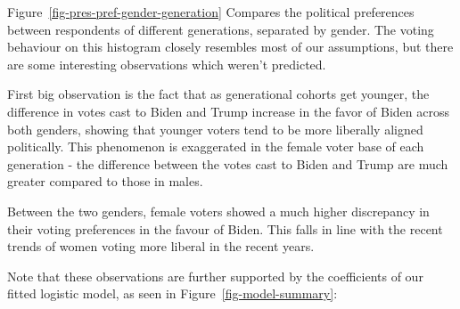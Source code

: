 \documentclass[
  letterpaper,
  DIV=11,
  numbers=noendperiod]{scrartcl}
\begin{document}
Figure~\ref{fig-pres-pref-gender-generation} Compares the political
preferences between respondents of different generations, separated by
gender. The voting behaviour on this histogram closely resembles most of
our assumptions, but there are some interesting observations which
weren't predicted.

First big observation is the fact that as generational cohorts get
younger, the difference in votes cast to Biden and Trump increase in the
favor of Biden across both genders, showing that younger voters tend to
be more liberally aligned politically. This phenomenon is exaggerated in
the female voter base of each generation - the difference between the
votes cast to Biden and Trump are much greater compared to those in
males.

Between the two genders, female voters showed a much higher discrepancy
in their voting preferences in the favour of Biden. This falls in line
with the recent trends of women voting more liberal in the recent years.

Note that these observations are further supported by the coefficients
of our fitted logistic model, as seen in Figure~\ref{fig-model-summary}:
\end{document}
